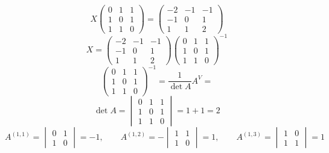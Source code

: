 \documentclass[a4paper]{article}
\theoremstyle{definition}
\theoremstyle{plain}
\begin{document}
\begin{equation*}
  X
  \begin{pmatrix}
    0 & 1 & 1\\
    1 & 0 & 1\\
    1 & 1 & 0
  \end{pmatrix}
  =
  \begin{pmatrix}
    -2 & -1 & -1\\
    -1 & 0 & 1\\
    1 & 1 & 2
  \end{pmatrix}
\end{equation*}
\begin{equation*}
  X
  =
  \begin{pmatrix}
    -2 & -1 & -1\\
    -1 & 0 & 1\\
    1 & 1 & 2
  \end{pmatrix}
  \begin{pmatrix}
    0 & 1 & 1\\
    1 & 0 & 1\\
    1 & 1 & 0
  \end{pmatrix}^{-1}
\end{equation*}
\begin{equation}\label{eq:1}
  \begin{pmatrix}
    0 & 1 & 1\\
    1 & 0 & 1\\
    1 & 1 & 0
  \end{pmatrix}^{-1}
  =
  \frac{1}{\det A}A^{V} =
\end{equation}
\begin{equation*}
  \det A =
  \begin{vmatrix}
    0 & 1 & 1\\
    1 & 0 & 1\\
    1 & 1 & 0
  \end{vmatrix}
  =
  1 + 1
  =
  2
\end{equation*}
\begin{equation*}
  A^{(1,1)}=
  \begin{vmatrix}
    0 & 1\\
    1 & 0
  \end{vmatrix}
  = -1
  , \qquad
  A^{(1, 2)} = -
  \begin{vmatrix}
    1 & 1\\
    1 & 0
  \end{vmatrix}
  = 1, \qquad
  A^{(1, 3)} =
  \begin{vmatrix}
    1 & 0\\
    1 & 1
  \end{vmatrix}
  = 1
\end{equation*}
\end{document}
